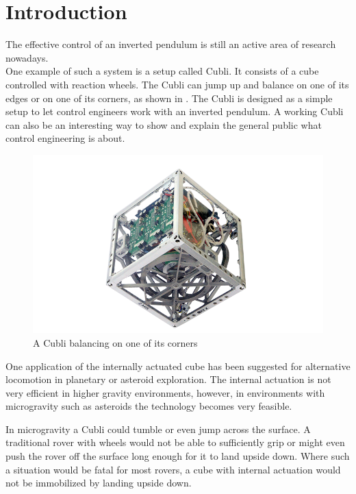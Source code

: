 \chapter{Introduction}\label{introduction}
The effective control of an inverted pendulum is still an active area of research nowadays.\cite{JHuber}\\
One example of such a system is a setup called Cubli. It consists of a cube controlled with reaction wheels. The Cubli can jump up and balance on one of its edges or on one of its corners, as shown in .
The Cubli is designed as a simple setup to let control engineers work with an inverted pendulum. A working Cubli can also be an interesting way to show and explain the general public  what control engineering is about.\cite{MGajamohan}
%
\begin{figure}[H] 
	\centering
	\includegraphics[scale=1.3]{figures/CubliCorner-700x4302}
	\caption{A Cubli balancing on one of its corners \cite{RAndrea}}
	\label{CubliCorner}
\end{figure}
%
One application of the internally actuated cube has been suggested for alternative locomotion in planetary or asteroid exploration. The internal actuation is not very efficient in higher gravity environments, however, in environments with microgravity such as asteroids the technology becomes very feasible.\cite{RAllen}

In microgravity a Cubli could tumble or even jump across the surface. A traditional rover with wheels would not be able to sufficiently grip or might even push the rover off the surface long enough for it to land upside down. Where such a situation would be fatal for most rovers, a cube with internal actuation would not be immobilized by landing upside down. \cite{ELandau}

